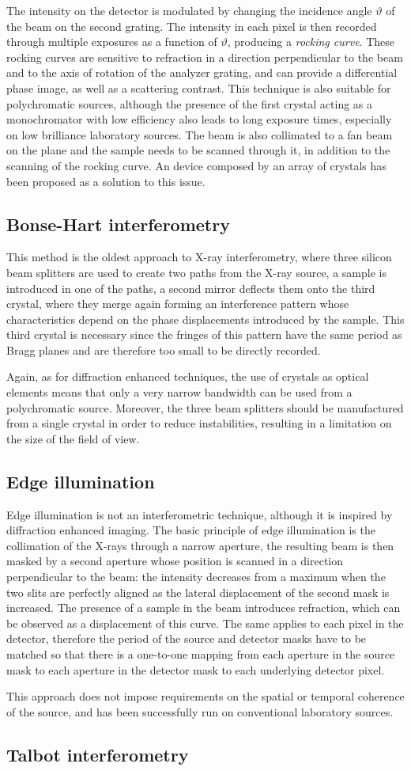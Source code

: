 The intensity on the detector is modulated by changing the incidence angle
$\vartheta$ of the beam on the second grating. The intensity in each pixel
is then recorded through multiple exposures as a function of $\vartheta$,
producing a \emph{rocking curve}. These rocking curves are sensitive to
refraction in a direction perpendicular to the beam and to the axis of
rotation of the analyzer grating, and can provide a differential phase
image, as well as a scattering contrast. This technique is also suitable for
polychromatic sources, although the presence of the first crystal acting as
a monochromator with low efficiency also leads to long exposure times,
especially on low brilliance laboratory sources. The beam is also collimated
to a fan beam on the plane and the sample needs to be scanned through it, in
addition to the scanning of the rocking curve. An device composed by an
array of crystals has been proposed as a solution to this issue.

\subsection{Bonse-Hart interferometry}
This method is the oldest approach to X-ray interferometry, where three
silicon beam splitters are used to create two paths from the X-ray source, a
sample is introduced in one of the paths, a second mirror deflects them onto
the third crystal, where they merge again forming an interference pattern
whose characteristics depend on the phase displacements introduced by the
sample. This third crystal is necessary since the fringes of this pattern
have the same period as Bragg planes and are therefore too small to be
directly recorded.

Again, as for diffraction enhanced techniques, the use of crystals as
optical elements means that only a very narrow bandwidth can be used from a
polychromatic source. Moreover, the three beam splitters should be
manufactured from a single crystal in order to reduce instabilities,
resulting in a limitation on the size of the field of view.

\subsection{Edge illumination}
Edge illumination is not an interferometric technique, although it is
inspired by diffraction enhanced imaging. The basic principle of edge
illumination is the collimation of the X-rays through a narrow aperture,
the resulting beam is then masked by a second aperture whose position is
scanned in a direction perpendicular to the beam: the intensity decreases from a
maximum when the two slits are perfectly aligned as the lateral displacement
of the second mask is increased.
The presence of a sample in the beam introduces refraction, which can be
observed as a displacement of this curve. The same applies to each pixel in
the detector, therefore the period of the source and detector masks have to
be matched so that there is a one-to-one mapping from each aperture in the
source mask to each aperture in the detector mask to each underlying
detector pixel.

This approach does not impose requirements on the spatial or temporal
coherence of the source, and has been successfully run on conventional
laboratory sources.

\subsection{Talbot interferometry}
